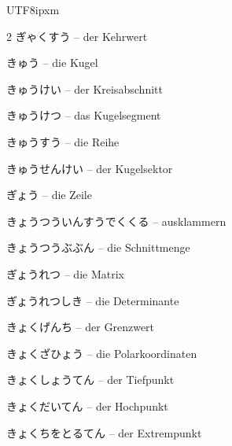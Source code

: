 \begin{CJK}{UTF8}{ipxm}
\begin{multicols}{2}
 {\footnotesize\color{black!70}ぎゃくすう} -- der Kehrwert\dotfill\hyperref[e:39]{\pageref*{e:39}}\par
{} {\footnotesize\color{black!70}きゅう} -- die Kugel\dotfill\hyperref[e:232]{\pageref*{e:232}}\par
{} {\footnotesize\color{black!70}きゅうけい} -- der Kreisabschnitt\dotfill\hyperref[e:222]{\pageref*{e:222}}\par
{} {\footnotesize\color{black!70}きゅうけつ} -- das Kugelsegment\dotfill\hyperref[e:240]{\pageref*{e:240}}\par
{} {\footnotesize\color{black!70}きゅうすう} -- die Reihe\dotfill\hyperref[e:265]{\pageref*{e:265}}\par
{} {\footnotesize\color{black!70}きゅうせんけい} -- der Kugelsektor\dotfill\hyperref[e:241]{\pageref*{e:241}}\par
{} {\footnotesize\color{black!70}ぎょう} -- die Zeile\dotfill\hyperref[e:322]{\pageref*{e:322}}\par
{} {\footnotesize\color{black!70}きょうつういんすうでくくる} -- ausklammern\dotfill\hyperref[e:92]{\pageref*{e:92}}\par
{} {\footnotesize\color{black!70}きょうつうぶぶん} -- die Schnittmenge\dotfill\hyperref[e:100]{\pageref*{e:100}}\par
{} {\footnotesize\color{black!70}ぎょうれつ} -- die Matrix\dotfill\hyperref[e:320]{\pageref*{e:320}}\par
{} {\footnotesize\color{black!70}ぎょうれつしき} -- die Determinante\dotfill\hyperref[e:325]{\pageref*{e:325}}\par
{} {\footnotesize\color{black!70}きょくげんち} -- der Grenzwert\dotfill\hyperref[e:264]{\pageref*{e:264}}\par
{} {\footnotesize\color{black!70}きょくざひょう} -- die Polarkoordinaten\dotfill\hyperref[e:311]{\pageref*{e:311}}\par
{} {\footnotesize\color{black!70}きょくしょうてん} -- der Tiefpunkt\dotfill\hyperref[e:283]{\pageref*{e:283}}\par
{} {\footnotesize\color{black!70}きょくだいてん} -- der Hochpunkt\dotfill\hyperref[e:282]{\pageref*{e:282}}\par
{} {\footnotesize\color{black!70}きょくちをとるてん} -- der Extrempunkt\dotfill\hyperref[e:281]{\pageref*{e:281}}\par

\end{multicols}
\end{CJK}
